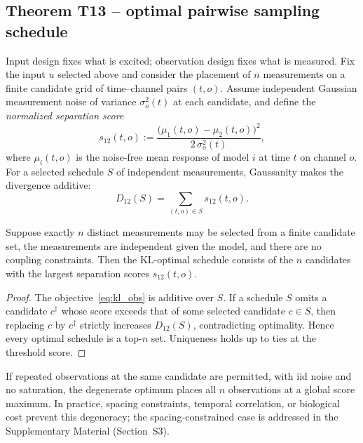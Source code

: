 \subsection{Theorem T13 -- optimal pairwise sampling schedule}

Input design fixes what is excited; observation design fixes what is measured. Fix the input \(u\) selected above and consider the placement of \(n\) measurements on a finite candidate grid of time--channel pairs \((t, o)\). Assume independent Gaussian measurement noise of variance \(\sigma_o^2(t)\) at each candidate, and define the \emph{normalized separation score}
\begin{equation}
s_{12}(t, o) := \frac{\bigl( \mu_1(t, o) - \mu_2(t, o) \bigr)^2}{2\,\sigma_o^2(t)},
\label{eq:sep_score}
\end{equation}
where \(\mu_i(t,o)\) is the noise-free mean response of model \(i\) at time \(t\) on channel \(o\). For a selected schedule \(S\) of independent measurements, Gaussanity makes the divergence additive:
\begin{equation}
D_{12}(S) = \sum_{(t,o) \in S} s_{12}(t, o).
\label{eq:kl_obs}
\end{equation}

\begin{theorem}
\label{thm:T13}
Suppose exactly \(n\) distinct measurements may be selected from a finite candidate set, the measurements are independent given the model, and there are no coupling constraints. Then the KL-optimal schedule consists of the \(n\) candidates with the largest separation scores \(s_{12}(t, o)\).
\end{theorem}

\begin{proof}
The objective~\eqref{eq:kl_obs} is additive over \(S\). If a schedule \(S\) omits a candidate \(c^{\dagger}\) whose score exceeds that of some selected candidate \(c \in S\), then replacing \(c\) by \(c^{\dagger}\) strictly increases \(D_{12}(S)\), contradicting optimality. Hence every optimal schedule is a top-\(n\) set. Uniqueness holds up to ties at the threshold score.
\end{proof}

\begin{remark}
If repeated observations at the same candidate are permitted, with iid noise and no saturation, the degenerate optimum places all \(n\) observations at a global score maximum. In practice, spacing constraints, temporal correlation, or biological cost prevent this degeneracy; the spacing-constrained case is addressed in the Supplementary Material (Section~S3).
\end{remark}

